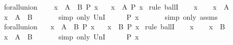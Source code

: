 \begin{isabellebody}
\ forall{\isacharunderscore}union{}{\isacharcolon}\ \isanewline
\ \ \ {\isachardoublequoteopen}{\isasymforall}x\ {\isasymin}\ A\ {\isasymunion}\ B{\isachardot}\ P\ x{\isachardoublequoteclose}\isanewline
\ \ \ {\isachardoublequoteopen}{\isasymforall}x\ {\isasymin}\ A{\isachardot}\ P\ x{\isachardoublequoteclose}\isanewline
%
\isadelimproof
%
\endisadelimproof
%
\isatagproof
{}\isamarkupfalse%
\ {\isacharparenleft}rule\ ballI{\isacharparenright}\isanewline
\ \ \isamarkupfalse%
\ x\isanewline
\ \ \isamarkupfalse%
\ {\isachardoublequoteopen}x\ {\isasymin}\ A{\isachardoublequoteclose}\isanewline
\ \ \isamarkupfalse%
\ \isamarkupfalse%
\ {\isachardoublequoteopen}x\ {\isasymin}\ A\ {\isasymunion}\ B{\isachardoublequoteclose}\ \isanewline
\ \ \ \ \isamarkupfalse%
\ {\isacharparenleft}simp\ only{\isacharcolon}\ UnI{}{\isacharparenright}\isanewline
\ \ \isamarkupfalse%
\ \isamarkupfalse%
\ {\isachardoublequoteopen}P\ x{\isachardoublequoteclose}\ \isanewline
\ \ \ \ \isamarkupfalse%
\ {\isacharparenleft}simp\ only{\isacharcolon}\ assms{\isacharparenright}\isanewline
{}\isamarkupfalse%
%
\endisatagproof
{\isafoldproof}%
%
\isadelimproof
\isanewline
%
\endisadelimproof
\isanewline
{}\isamarkupfalse%
\ forall{\isacharunderscore}union{}{\isacharcolon}\isanewline
\ \ \ {\isachardoublequoteopen}{\isasymforall}x\ {\isasymin}\ A\ {\isasymunion}\ B{\isachardot}\ P\ x{\isachardoublequoteclose}\isanewline
\ \ \ {\isachardoublequoteopen}{\isasymforall}x\ {\isasymin}\ B{\isachardot}\ P\ x{\isachardoublequoteclose}\isanewline
%
\isadelimproof
%
\endisadelimproof
%
\isatagproof
{}\isamarkupfalse%
\ {\isacharparenleft}rule\ ballI{\isacharparenright}\isanewline
\ \ \isamarkupfalse%
\ x\isanewline
\ \ \isamarkupfalse%
\ {\isachardoublequoteopen}x\ {\isasymin}\ B{\isachardoublequoteclose}\isanewline
\ \ \isamarkupfalse%
\ \isamarkupfalse%
\ {\isachardoublequoteopen}x\ {\isasymin}\ A\ {\isasymunion}\ B{\isachardoublequoteclose}\ \isanewline
\ \ \ \ \isamarkupfalse%
\ {\isacharparenleft}simp\ only{\isacharcolon}\ UnI{}{\isacharparenright}\isanewline
\ \ \isamarkupfalse%
\ \isamarkupfalse%
\ {\isachardoublequoteopen}P\ x{\isachardoublequoteclose}\ \isanewline

\end{isabellebody}
